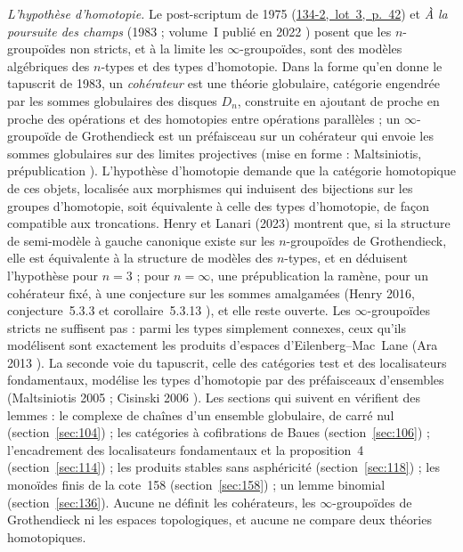 \documentclass[11pt]{article}
\newcommand{\lot}[3]{\mbox{\href{https://grothendieck.commutator.io/\##1/#2/p#3}{#1, lot #2, p.~#3}}}
\theoremstyle{plain}
\theoremstyle{definition}
\theoremstyle{plain}
\theoremstyle{definition}
\theoremstyle{remark}
\renewcommand{\_}{\bkunderscore\allowbreak}
\begin{document}
\noindent\emph{L'hypothèse d'homotopie.} Le post-scriptum de 1975 (\lot{134-2}{3}{42}) et \emph{À la poursuite des champs} (1983 ; volume~I publié en 2022 \cite{pursuingstacks2022}) posent que les $n$-groupoïdes non stricts, et à la limite les $\infty$-groupoïdes, sont des modèles algébriques des $n$-types et des types d'homotopie. Dans la forme qu'en donne le tapuscrit de 1983, un \emph{cohérateur} est une théorie globulaire, catégorie engendrée par les sommes globulaires des disques $D_n$, construite en ajoutant de proche en proche des opérations et des homotopies entre opérations parallèles ; un $\infty$-groupoïde de Grothendieck est un préfaisceau sur un cohérateur qui envoie les sommes globulaires sur des limites projectives (mise en forme : Maltsiniotis, prépublication \cite{maltsiniotis2010}). L'hypothèse d'homotopie demande que la catégorie homotopique de ces objets, localisée aux morphismes qui induisent des bijections sur les groupes d'homotopie, soit équivalente à celle des types d'homotopie, de façon compatible aux troncations. Henry et Lanari (2023) \cite{henrylanari2023} montrent que, si la structure de semi-modèle à gauche canonique existe sur les $n$-groupoïdes de Grothendieck, elle est équivalente à la structure de modèles des $n$-types, et en déduisent l'hypothèse pour $n = 3$ ; pour $n = \infty$, une prépublication la ramène, pour un cohérateur fixé, à une conjecture sur les sommes amalgamées (Henry 2016, conjecture~5.3.3 et corollaire~5.3.13 \cite{henry2016}), et elle reste ouverte. Les $\infty$-groupoïdes stricts ne suffisent pas : parmi les types simplement connexes, ceux qu'ils modélisent sont exactement les produits d'espaces d'Eilenberg--Mac~Lane (Ara 2013 \cite{ara2013}). La seconde voie du tapuscrit, celle des catégories test et des localisateurs fondamentaux, modélise les types d'homotopie par des préfaisceaux d'ensembles (Maltsiniotis 2005 \cite{maltsiniotis2005} ; Cisinski 2006 \cite{cisinski2006}). Les sections qui suivent en vérifient des lemmes : le complexe de chaînes d'un ensemble globulaire, de carré nul (section~\ref{sec:104}) ; les catégories à cofibrations de Baues (section~\ref{sec:106}) ; l'encadrement des localisateurs fondamentaux et la proposition~4 (section~\ref{sec:114}) ; les produits stables sans asphéricité (section~\ref{sec:118}) ; les monoïdes finis de la cote~158 (section~\ref{sec:158}) ; un lemme binomial (section~\ref{sec:136}). Aucune ne définit les cohérateurs, les $\infty$-groupoïdes de Grothendieck ni les espaces topologiques, et aucune ne compare deux théories homotopiques.
\end{document}
